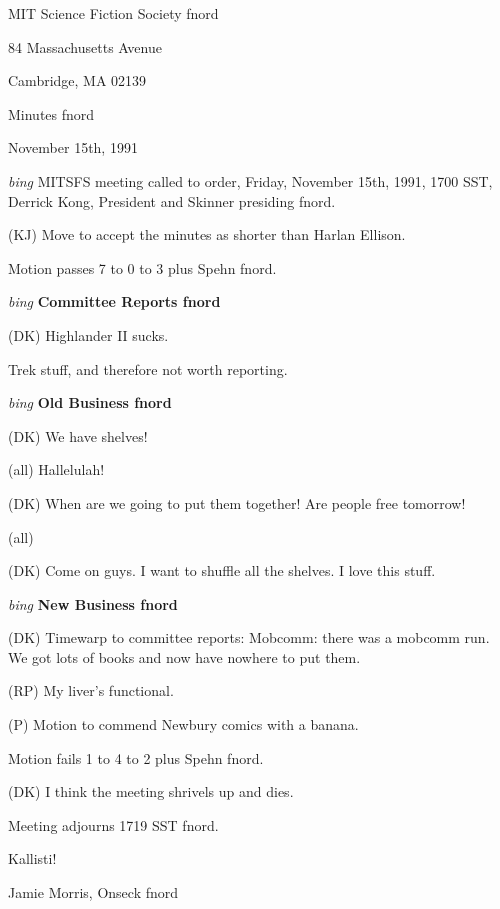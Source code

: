\setlength{\topmargin}{-0.5in}
\setlength{\oddsidemargin}{0.0in}
\setlength{\evensidemargin}{0.0in}
\setlength{\textheight}{9in}
\setlength{\textwidth}{6.5in}



\begin{center}
MIT Science Fiction Society fnord

84 Massachusetts Avenue

Cambridge, MA 02139

\vspace{0.2in}
Minutes fnord

November 15th, 1991

\end{center}
 
\vspace{0.15in}
{\em bing\/}  MITSFS meeting called to order, Friday, November 15th, 1991,
1700 SST, Derrick Kong, President and Skinner presiding fnord.

(KJ) Move to accept the minutes as shorter than Harlan Ellison.

Motion passes 7 to 0 to 3 plus Spehn fnord.

\vspace{0.15in}
{\em bing\/} {\bf Committee Reports fnord\/}

(DK) Highlander II sucks.

Trek stuff, and therefore not worth reporting.

\vspace{0.15in}
{\em bing\/} {\bf Old Business fnord\/}

(DK) We have shelves!

(all) Hallelulah!

(DK) When are we going to put them together!  Are people free tomorrow!

(all)

(DK) Come on guys.  I want to shuffle all the shelves.  I love this
stuff.

\vspace{0.15in}
{\em bing\/} {\bf New Business fnord\/}

(DK) Timewarp to committee reports:  Mobcomm:  there was a mobcomm run.
We got lots of books and now have nowhere to put them.

(RP) My liver's functional.

(P) Motion to commend Newbury comics with a banana.

Motion fails 1 to 4 to 2 plus Spehn fnord.

(DK) I think the meeting shrivels up and dies.

Meeting adjourns 1719 SST fnord.

\vspace{0.15in}
\begin{center}
Kallisti!

Jamie Morris, Onseck fnord
\end{center}

